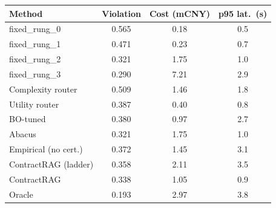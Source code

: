 \begin{tabular}{lccc}
\toprule
Method & Violation & Cost (mCNY) & p95 lat.\ (s) \\
\midrule
fixed_rung_0 & 0.565 & 0.18 & 0.5 \\
fixed_rung_1 & 0.471 & 0.23 & 0.7 \\
fixed_rung_2 & 0.321 & 1.75 & 1.0 \\
fixed_rung_3 & 0.290 & 7.21 & 2.9 \\
Complexity router & 0.509 & 1.46 & 1.8 \\
Utility router & 0.387 & 0.40 & 0.8 \\
BO-tuned & 0.380 & 0.97 & 2.7 \\
Abacus & 0.321 & 1.75 & 1.0 \\
Empirical (no cert.) & 0.372 & 1.45 & 3.1 \\
ContractRAG (ladder) & 0.358 & 2.11 & 3.5 \\
ContractRAG & 0.338 & 1.05 & 0.9 \\
Oracle & 0.193 & 2.97 & 3.8 \\
\bottomrule
\end{tabular}